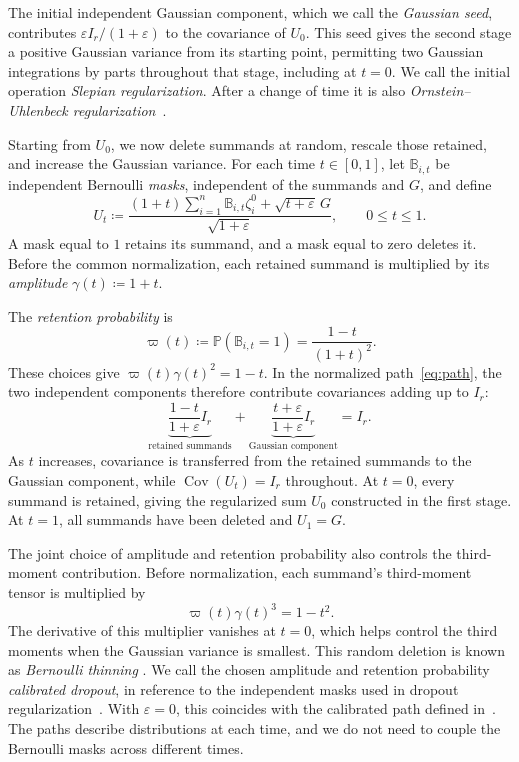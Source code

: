 \documentclass[11pt,letterpaper]{article}
\theoremstyle{remark}
\newcommand{\Pp}{\mathbb P}
\newcommand{\Cov}{\operatorname{Cov}}
\begin{document}
\begin{samepage}
{The initial independent Gaussian component, which we call the
\emph{Gaussian seed}, contributes \(\varepsilon I_r/(1+\varepsilon)\)
to the covariance of \(U_0\). This seed gives the second stage a positive
Gaussian variance from its starting point, permitting two Gaussian
integrations by parts throughout that stage, including at \(t=0\).
We call the initial operation \emph{Slepian regularization}.}
After a change of time it is also
\emph{Ornstein--Uhlenbeck regularization}~\cite[Theorem~4.12]{Nourdin2012}.
\par
\end{samepage}

{Starting from \(U_0\), we now delete summands at random,
rescale those retained, and increase the Gaussian variance.
For each time \(t\in[0,1]\), let \(\mathbb B_{i,t}\) be independent Bernoulli
\emph{masks}, independent of the summands and \(G\), and define}
\begin{equation}
 U_t\coloneqq
 \frac{(1+t)\sum_{i=1}^n\mathbb B_{i,t}\zeta_i^0
             +\sqrt{t+\varepsilon}\,G}{\sqrt{1+\varepsilon}},
 \qquad 0\le t\le1.
 \label{eq:path}
\end{equation}
A mask equal to \(1\) retains its summand, and a mask equal to zero deletes it.
Before the common normalization, each retained summand is multiplied by its
\emph{amplitude} \(\gamma(t)\coloneqq1+t\).

The \emph{retention probability} is
\[
 \varpi(t)\coloneqq\Pp(\mathbb B_{i,t}=1)
             =\frac{1-t}{(1+t)^2}.
\]
These choices give \(\varpi(t)\gamma(t)^2=1-t\). In the normalized
path~\eqref{eq:path}, the two independent components therefore contribute
{covariances adding up to \(I_r\):}
\[
 \underbrace{\frac{1-t}{1+\varepsilon}I_r}_{\text{retained summands}}
 +\underbrace{\frac{t+\varepsilon}{1+\varepsilon}I_r}_{\text{Gaussian component}}
 =I_r.
\]
As \(t\) increases, covariance is transferred from the retained summands
to the Gaussian component, while \(\Cov(U_t)=I_r\) throughout.
{At \(t=0\), every summand is retained, giving the regularized
sum \(U_0\) constructed in the first stage. At \(t=1\), all summands have
been deleted and \(U_1=G\).}

{The joint choice of amplitude and retention probability also
controls the third-moment contribution. Before normalization, each summand's
third-moment tensor is multiplied by}
\[
 {\varpi(t)\gamma(t)^3=1-t^2.}
\]
{The derivative of this multiplier vanishes at \(t=0\),
which helps control the third moments when the Gaussian variance is smallest.}
This random deletion is known as \emph{Bernoulli thinning}
\cite{Renyi1956,SteutelHarn1979,LastPenrose2017}. We call the
chosen amplitude and retention probability \emph{calibrated dropout},
in reference to the independent masks used in dropout regularization~\cite{Dropout2014}.
With \(\varepsilon=0\), this coincides with the calibrated path
defined in~\cite[Section~4]{AL}.
The paths describe distributions at each time, and
we do not need to couple the Bernoulli masks across different times.
\end{document}
